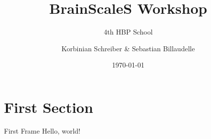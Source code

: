 \documentclass[aspectratio=169]{beamer}
\title{BrainScaleS Workshop}
\subtitle{4th HBP School}
\date{\today}
\author{Korbinian Schreiber \& Sebastian Billaudelle}
\institute{Kirchhoff-Institute for Physics, Heidelberg University}
\begin{document}
\maketitle

\section{First Section}

\begin{frame}{First Frame}
	Hello, world!
\end{frame}
\end{document}
